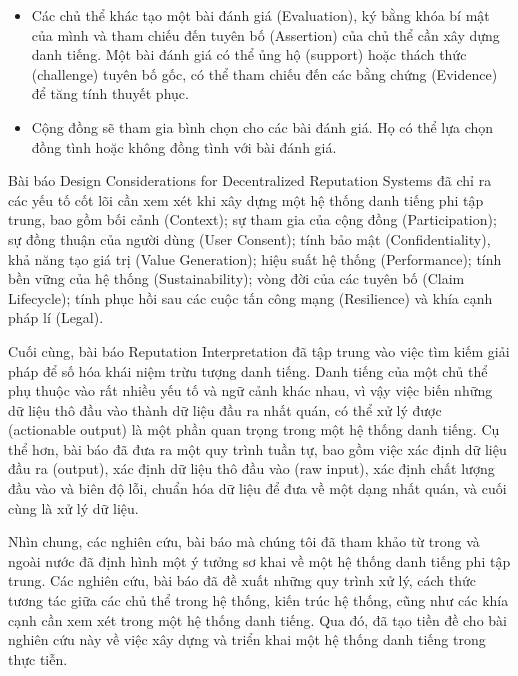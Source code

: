 \documentclass{article}[14pt]
\begin{document}
{\begin{itemize}
                \item Các chủ thể khác tạo một bài đánh giá (Evaluation), ký bằng khóa bí mật của mình và tham chiếu đến tuyên bố (Assertion) của chủ thể cần xây dựng danh tiếng. Một bài đánh giá có thể ủng hộ (support) hoặc thách thức (challenge) tuyên bố gốc, có thể tham chiếu đến các bằng chứng (Evidence) để tăng tính thuyết phục. 
                \item Cộng đồng sẽ tham gia bình chọn cho các bài đánh giá. Họ có thể lựa chọn đồng tình hoặc không đồng tình với bài đánh giá. 
            \end{itemize}
            Bài báo Design Considerations for Decentralized Reputation Systems \cite{reputation-design} đã chỉ ra các yếu tố cốt lõi cần xem xét khi xây dựng một hệ thống danh tiếng phi tập trung, bao gồm bối cảnh (Context); sự tham gia của cộng đồng (Participation); sự đồng thuận của người dùng (User Consent); tính bảo mật (Confidentiality), khả năng tạo giá trị (Value Generation); hiệu suất hệ thống (Performance); tính bền vững của hệ thống (Sustainability); vòng đời của các tuyên bố (Claim Lifecycle); tính phục hồi sau các cuộc tấn công mạng (Resilience) và khía cạnh pháp lí (Legal). 
            \par
            Cuối cùng, bài báo Reputation Interpretation \cite{reputation-interpretation} đã tập trung vào việc tìm kiếm giải pháp để số hóa khái niệm trừu tượng danh tiếng. Danh tiếng của một chủ thể phụ thuộc vào rất nhiều yếu tố và ngữ cảnh khác nhau, vì vậy việc biến những dữ liệu thô đầu vào thành dữ liệu đầu ra nhất quán, có thể xử lý được (actionable output) là một phần quan trọng trong một hệ thống danh tiếng. Cụ thể hơn, bài báo đã đưa ra một quy trình tuần tự, bao gồm việc xác định dữ liệu đầu ra (output), xác định dữ liệu thô đầu vào (raw input), xác định chất lượng đầu vào và biên độ lỗi, chuẩn hóa dữ liệu để đưa về một dạng nhất quán, và cuối cùng là xử lý dữ liệu.
            \par
            Nhìn chung, các nghiên cứu, bài báo mà chúng tôi đã tham khảo từ trong và ngoài nước đã định hình một ý tưởng sơ khai về một hệ thống danh tiếng phi tập trung. Các nghiên cứu, bài báo đã đề xuất những quy trình xử lý, cách thức tương tác giữa các chủ thể trong hệ thống, kiến trúc hệ thống, cũng như các khía cạnh cần xem xét trong một hệ thống danh tiếng. Qua đó, đã tạo tiền đề cho bài nghiên cứu này về việc xây dựng và triển khai một hệ thống danh tiếng trong thực tiễn.  

}
\end{document}
